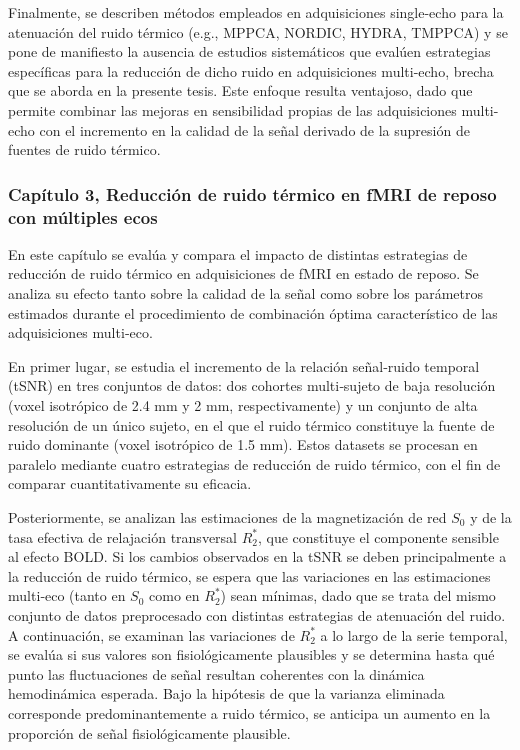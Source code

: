 Finalmente, se describen métodos empleados en adquisiciones single-echo para la atenuación del ruido térmico (e.g., MPPCA, NORDIC, HYDRA, TMPPCA) y se pone de manifiesto la ausencia de estudios sistemáticos que evalúen estrategias específicas para la reducción de dicho ruido en adquisiciones multi-echo, brecha que se aborda en la presente tesis. Este enfoque resulta ventajoso, dado que permite combinar las mejoras en sensibilidad propias de las adquisiciones multi-echo con el incremento en la calidad de la señal derivado de la supresión de fuentes de ruido térmico.


\subsubsection{Capítulo 3, 
Reducción de ruido térmico en fMRI de reposo con múltiples ecos}

En este capítulo se evalúa y compara el impacto de distintas estrategias de reducción de ruido térmico en adquisiciones de fMRI en estado de reposo. Se analiza su efecto tanto sobre la calidad de la señal como sobre los parámetros estimados durante el procedimiento de combinación óptima característico de las adquisiciones multi‑eco.

En primer lugar, se estudia el incremento de la relación señal‑ruido temporal (tSNR) en tres conjuntos de datos: dos cohortes multi‑sujeto de baja resolución (voxel isotrópico de 2.4 mm y 2 mm, respectivamente) y un conjunto de alta resolución de un único sujeto, en el que el ruido térmico constituye la fuente de ruido dominante (voxel isotrópico de 1.5 mm). Estos datasets se procesan en paralelo mediante cuatro estrategias de reducción de ruido térmico, con el fin de comparar cuantitativamente su eficacia.

Posteriormente, se analizan las estimaciones de la magnetización de red \(S_0\) y de la tasa efectiva de relajación transversal \(R_2^*\), que constituye el componente sensible al efecto BOLD. Si los cambios observados en la tSNR se deben principalmente a la reducción de ruido térmico, se espera que las variaciones en las estimaciones multi‑eco (tanto en \(S_0\) como en \(R_2^*\)) sean mínimas, dado que se trata del mismo conjunto de datos preprocesado con distintas estrategias de atenuación del ruido. A continuación, se examinan las variaciones de \(R_2^*\) a lo largo de la serie temporal, se evalúa si sus valores son fisiológicamente plausibles y se determina hasta qué punto las fluctuaciones de señal resultan coherentes con la dinámica hemodinámica esperada. Bajo la hipótesis de que la varianza eliminada corresponde predominantemente a ruido térmico, se anticipa un aumento en la proporción de señal fisiológicamente plausible.

